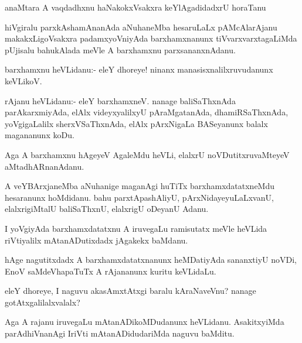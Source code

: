 \documentclass{article}
\begin{document}
\begin{mn}
anaMtara A vaqdadhxnu haNakokxVsakxra keYlAgadidadxrU horaTanu 
\end{mn}

\begin{mn}%
hiVgiralu parxkAshamAnanAda aNuhaneMba hesaruLaLx pAMcAlarAjanu
makakxLigoVsakxra padamxyoVniyAda barxhamxnanunx tiVvarxvarxtagaLiMda
pUjisalu bahukAlada meVle A barxhamxnu parxsananxnAdanu.
\end{mn}

\begin{mn}%
barxhamxnu heVLidanu:- eleY dhoreye! ninanx manasisxnalilxruvudanunx keVLikoV.
\end{mn}

\begin{mn}
rAjanu heVLidanu:- eleY barxhamxneV. nanage baliSaThxnAda
parAkarxmiyAda, elAlx videyxyalilxyU pAraMgatanAda, dhamiRSaThxnAda,
yoVgigaLalilx sherxVSaThxnAda, elAlx pArxNigaLa BASeyanunx balalx
magananunx koDu.
\end{mn}

\begin{mn}
Aga A barxhamxnu hAgeyeV AgaleMdu heVLi, elalxrU noVDutitxruvaMteyeV aMtadhARnanAdanu.
\end{mn}

\begin{mn}
A veYBArxjaneMba aNuhanige maganAgi huTiTx barxhamxdatatxneMdu
hesaranunx hoMdidanu. bahu parxtApashAliyU, pArxNidayeyuLaLxvanU,
elalxrigiMtalU baliSaThxnU, elalxrigU oDeyanU Adanu.
\end{mn}

\begin{mn}
I yoVgiyAda barxhamxdatatxnu A iruvegaLu ramisutatx meVle heVLida
riVtiyalilx mAtanADutixdadx jAgakekx baMdanu.
\end{mn}

\begin{mn}%
hAge nagutitxdadx A barxhamxdatatxnanunx heMDatiyAda sananxtiyU noVDi,
EnoV saMdeVhapaTuTx A rAjananunx kuritu keVLidaLu.
\end{mn}

\begin{mn}
eleY dhoreye, I naguvu akasAmxtAtxgi baralu kAraNaveVnu? nanage gotAtxgalilalxvalalx?
\end{mn}

\begin{mn}
Aga A rajanu iruvegaLu mAtanADikoMDudanunx heVLidanu. AsakitxyiMda
parAdhiVnanAgi IriVti mAtanADidudariMda naguvu baMditu.
\end{mn}
\end{document}
